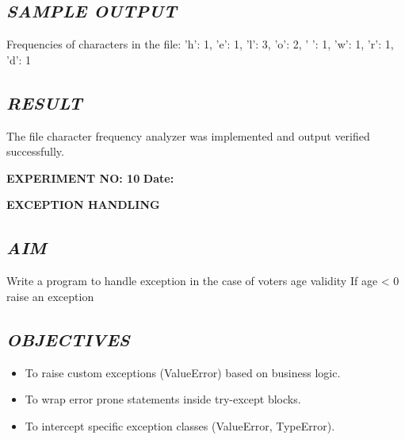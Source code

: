 \documentclass[11pt,a4paper]{article}
\begin{document}
\subsection*{\textit{SAMPLE OUTPUT}}
\begin{tcolorbox}[colback=black!85,colframe=navyblue,title=\textbf{Terminal Output},coltitle=white,fonttitle=\bfseries\small]
\small\ttfamily\color{green!30!white}
Frequencies of characters in the file: {'h': 1, 'e': 1, 'l': 3, 'o': 2, ' ': 1, 'w': 1, 'r': 1, 'd': 1}
\end{tcolorbox}

\subsection*{\textit{RESULT}}
The file character frequency analyzer was implemented and output verified successfully.

\newpage

\noindent
\textbf{\large EXPERIMENT NO: 10} \hfill \textbf{\large Date: \underline{\hspace{3cm}}}

\vspace{0.2cm}
\begin{center}
{\Huge \textbf{\textcolor{navyblue}{EXCEPTION HANDLING}}}
\end{center}
\vspace{0.3cm}

\subsection*{\textit{AIM}}
Write a program to handle exception in the case of voters age validity If age < 0 raise an exception

\subsection*{\textit{OBJECTIVES}}
\begin{itemize}
  \item To raise custom exceptions (ValueError) based on business logic.
  \item To wrap error prone statements inside try-except blocks.
  \item To intercept specific exception classes (ValueError, TypeError).
\end{itemize}
\end{document}
